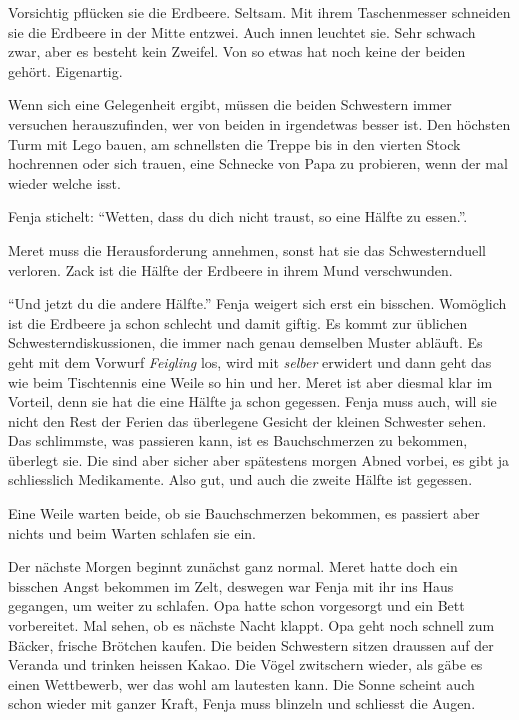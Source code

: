 Vorsichtig pflücken sie die Erdbeere. Seltsam. Mit ihrem Taschenmesser schneiden sie die Erdbeere in der Mitte entzwei. Auch innen leuchtet sie. Sehr schwach zwar, aber es besteht kein Zweifel. Von so etwas hat noch keine der beiden gehört. Eigenartig. 

Wenn sich eine Gelegenheit ergibt, müssen die beiden Schwestern immer versuchen herauszufinden, wer von beiden in irgendetwas besser ist. Den höchsten Turm mit Lego bauen, am schnellsten die Treppe bis in den vierten Stock hochrennen oder sich trauen, eine Schnecke von Papa zu probieren, wenn der mal wieder welche isst. 

Fenja stichelt: \enquote{Wetten, dass du dich nicht traust, so eine Hälfte zu essen.}. 

Meret muss die Herausforderung annehmen, sonst hat sie das Schwesternduell verloren. Zack ist die Hälfte der Erdbeere in ihrem Mund verschwunden.

\enquote{Und jetzt du die andere Hälfte.} Fenja weigert sich erst ein bisschen. Womöglich ist die Erdbeere ja schon schlecht und damit giftig. Es kommt zur üblichen Schwesterndiskussionen, die immer nach genau demselben Muster abläuft. Es geht mit dem Vorwurf \textit{Feigling} los, wird mit \textit{selber} erwidert und dann geht das wie beim Tischtennis eine Weile so hin und her. Meret ist aber diesmal klar im Vorteil, denn sie hat die eine Hälfte ja schon gegessen. Fenja muss auch, will sie nicht den Rest der Ferien das überlegene Gesicht der kleinen Schwester sehen. Das schlimmste, was passieren kann, ist es Bauchschmerzen zu bekommen, überlegt sie. Die sind aber sicher aber spätestens morgen Abned vorbei, es gibt ja schliesslich Medikamente. Also gut, und auch die zweite Hälfte ist gegessen.

Eine Weile warten beide, ob sie Bauchschmerzen bekommen, es passiert aber nichts und beim Warten schlafen sie ein.

\begin{center}
    {\color{red}\aldineleft}
\end{center}

Der nächste Morgen beginnt zunächst ganz normal. Meret hatte doch ein bisschen Angst bekommen im Zelt, deswegen war Fenja mit ihr ins Haus gegangen, um weiter zu schlafen. Opa hatte schon vorgesorgt und ein Bett vorbereitet. Mal sehen, ob es nächste Nacht klappt. Opa geht noch schnell zum Bäcker, frische Brötchen kaufen. Die beiden Schwestern sitzen draussen auf der Veranda und trinken heissen Kakao. Die Vögel zwitschern wieder, als gäbe es einen Wettbewerb, wer das wohl am lautesten kann. Die Sonne scheint auch schon wieder mit ganzer Kraft, Fenja muss blinzeln und schliesst die Augen.

